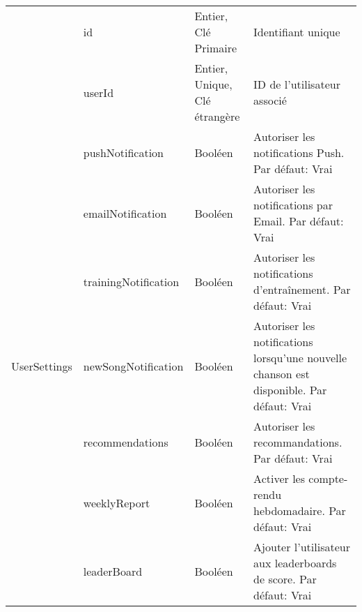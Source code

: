 \begin{longtable}[c]{@{}|p{}|p{}|p{}|p{}|@{}}
														& id                                                   & Entier, Clé Primaire                                                                     & Identifiant unique                                                                       \\* \cmidrule(l){2-4} 
														& userId                                               & Entier, Unique, Clé étrangère                                                            & ID de l’utilisateur associé                                                              \\* \cmidrule(l){2-4} 
														& pushNotification                                     & Booléen                                                                                  & Autoriser les notifications Push. Par défaut: Vrai                                       \\* \cmidrule(l){2-4} 
														& emailNotification                                    & Booléen                                                                                  & Autoriser les notifications par Email. Par défaut: Vrai                                  \\* \cmidrule(l){2-4} 
														& trainingNotification                                 & Booléen                                                                                  & Autoriser les notifications d'entraînement. Par défaut: Vrai                             \\* \cmidrule(l){2-4} 
	\multirow{-6}{*}{UserSettings} 					& newSongNotification                                  & Booléen                                                                                  & Autoriser les notifications lorsqu’une nouvelle chanson est disponible. Par défaut: Vrai \\* \cmidrule(l){2-4} 
														& recommendations                                      & Booléen                                                                                  & Autoriser les recommandations. Par défaut: Vrai                                          \\* \cmidrule(l){2-4} 
														& weeklyReport                                         & Booléen                                                                                  & Activer les compte-rendu hebdomadaire. Par défaut: Vrai                                  \\* \cmidrule(l){2-4} 
														& leaderBoard                                          & Booléen                                                                                  & Ajouter l'utilisateur aux leaderboards de score. Par défaut: Vrai                        \\* \cmidrule(l){2-4} 

\end{longtable}
